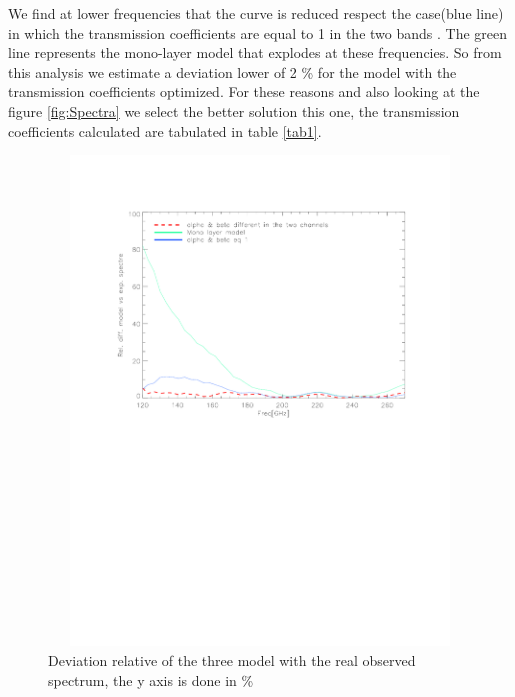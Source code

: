 \documentclass[a4paper,10pt]{article}
\begin{document}
We find at lower frequencies that the curve is reduced respect the case(blue line) in which the transmission coefficients are equal to 1 in the two bands . The green line represents the mono-layer model that explodes at these frequencies. So from this analysis we estimate a deviation lower of 2 \% for the model with the transmission coefficients optimized. For these reasons and also looking at the figure \eqref{fig:Spectra} we select the better solution this one, the transmission coefficients calculated are tabulated in table \eqref{tab1}.
\begin{figure}[!h]
	\centering
	\includegraphics[height=13cm, width=16cm, trim=0cm 8cm 0cm 2cm, clip=true]{figures/Rel_diff_model}
	\caption{Deviation relative of the three model with the real observed spectrum, the y axis is done in \% }
	\label{fig:deviation}
\end{figure}
\end{document}
